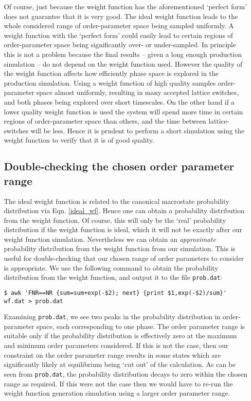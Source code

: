 \documentclass{report}
\begin{document}
Of course, just because the weight function has the aforementioned `perfect form' does not guarantee that it is very good. The ideal weight function
leads to the whole considered range of order-parameter space being sampled uniformly. A weight function with the `perfect form' could easily lead to
certain regions of order-parameter space being significantly over- or under-sampled. In principle this is not a problem because the final results -- given
a long enough production simulation -- do not depend on the weight function used. However the quality of the weight function affects how efficiently 
phase space is explored in the production simulation. Using a weight function of high quality samples order-parameter space almost uniformly, resulting
in many accepted lattice switches, and both phases being explored over short timescales. On the other hand if a lower quality weight function is used the
system will spend more time in certain regions of order-parameter space than others, and the time between lattice-switches will be less. Hence it is prudent
to perform a short simulation using the weight function to verify that it is of good quality.

\subsection{Double-checking the chosen order parameter range}\label{section:double_check}
The ideal weight function is related to the canonical macrostate probability distribution via Eqn. \eqref{ideal_wf}. Hence one can obtain a probability
distribution from the weight function. Of course, this will only be the `real' probability distribution if the weight function is ideal, which it
will not be exactly after our weight function simulation. Nevertheless we can obtain an \emph{approximate} probability distribution from the weight
function from our simulation. This is useful for double-checking that our chosen range of order parameters to consider is appropriate. We use the
following command to obtain the probability distribution from the weight function, and output it to the file \texttt{prob.dat}:
\begin{verbatim}
$ awk 'FNR==NR {sum=sum+exp(-$2); next} {print $1,exp(-$2)/sum}'
wf.dat > prob.dat
\end{verbatim}
Examining \texttt{prob.dat}, we see two peaks in the probability distribution in order-parameter space, each corresponding to one phase. The order parameter
range is suitable only if the probability distribution is effectively zero at the maximum and minimum order parameters considered. If this is not the
case, then our constraint on the order parameter range results in some states which are significantly likely at equilibrium being `cut out' of the
calculation. As can be seen from \texttt{prob.dat}, the probability distribution decays to zero within the chosen range as required. If this were not the
case then we would have to re-run the weight function generation simulation using a larger order parameter range.
\end{document}
